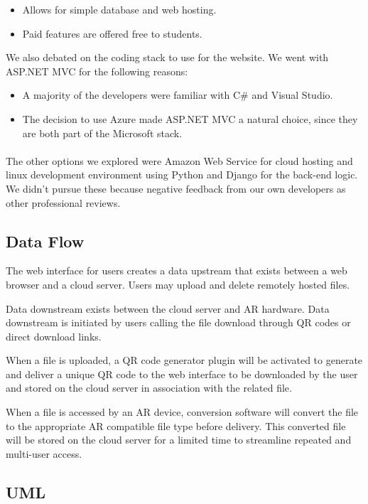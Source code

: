  \begin{itemize}
    \item Allows for simple database and web hosting.
    \item Paid features are offered free to students.
 \end{itemize}

 We also debated on the coding stack to use for the website.
 We went with ASP.NET MVC for the following reasons:
\begin{itemize}
    \item A majority of the developers were familiar with C\# and Visual Studio.
    \item The decision to use Azure made ASP.NET MVC a natural choice, since they are both part of the Microsoft stack.
\end{itemize}

\paragraph{}
The other options we explored were Amazon Web Service for cloud hosting and linux development environment using Python and Django for the back-end logic.
We didn't pursue these because negative feedback from our own developers as other professional reviews.

 \subsection{Data Flow}
The web interface for users creates a data upstream that exists between a web browser and a cloud server. Users may upload and delete remotely hosted files.

Data downstream exists between the cloud server and AR hardware. Data downstream is initiated by users calling the file download through QR codes or direct download links. 

When a file is uploaded, a QR code generator plugin will be activated to generate and deliver a unique QR code to the web interface to be downloaded by the user and stored on the cloud server in association with the related file. 

When a file is accessed by an AR device, conversion software will convert the file to the appropriate AR compatible file type before delivery. This converted file will be stored on the cloud server for a limited time to streamline repeated and multi-user access.
  
\subsection{UML}
 
